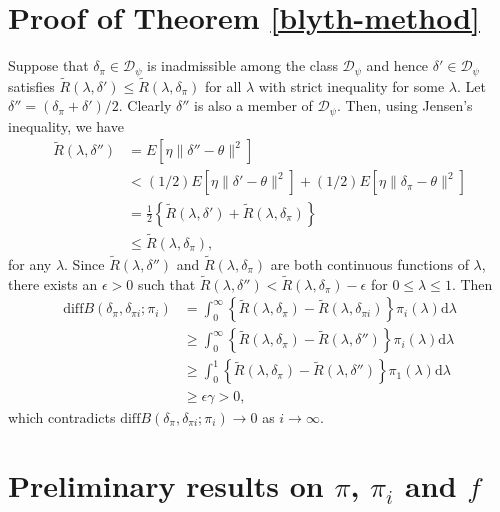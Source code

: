 \documentclass[preprint,11pt]{imsart}
\numberwithin{equation}{section}
\theoremstyle{plain}
\theoremstyle{definition}
\theoremstyle{remark}
\newcommand{\rd}{\mathrm{d}}
\newcommand{\ndiff}{\mathrm{diff}B}
\begin{document}
\section{Proof of Theorem \ref{blyth-method}}
\label{sec:ap.blyth-method}
 Suppose that $ \delta_\pi\in\mathcal{D}_\psi$ is inadmissible among the class $\mathcal{D}_\psi$
 and hence  $\delta'\in\mathcal{D}_\psi$ satisfies 
$ \tilde{R}(\lambda,\delta') \leq \tilde{R}(\lambda,\delta_\pi)$ for all $\lambda$
with strict inequality for some $\lambda$.
 Let $\delta''=(\delta_\pi+\delta')/2$. Clearly $\delta''$ is also a member of
 $\mathcal{D}_\psi$.
Then, using Jensen's inequality, we have
\begin{align*}
 \tilde{R}(\lambda,\delta'')
&=E\left[\eta\|\delta''-\theta\|^2\right] \\
&<(1/2)E\left[\eta\|\delta'-\theta\|^2\right] +(1/2)E\left[\eta\|\delta_\pi -\theta\|^2\right] \\
 &= \frac{1}{2}\left\{\tilde{R}(\lambda,\delta')+\tilde{R}(\lambda,\delta_\pi)\right\} \\
 &\leq  \tilde{R}(\lambda,\delta_\pi),
\end{align*}
for any $\lambda$. 
Since $  \tilde{R}(\lambda,\delta'')$ and $  \tilde{R}(\lambda,\delta_\pi)$ are both continuous
 functions of $\lambda$, there exists an $ \epsilon>0$ such that
$ \tilde{R}(\lambda,\delta'')< \tilde{R}(\lambda,\delta_\pi)-\epsilon$ for 
$ 0\leq \lambda\leq 1$. 
Then 
\begin{align*}
 \ndiff(\delta_\pi,\delta_{\pi i};\pi_i)
 &= \int_0^\infty \left\{\tilde{R}(\lambda,\delta_\pi)-\tilde{R}(\lambda,\delta_{\pi i})\right\}
 \pi_i(\lambda)\rd \lambda \\
 &\geq  \int_0^\infty
\left\{\tilde{R}(\lambda,\delta_\pi)-\tilde{R}(\lambda,\delta'')\right\}\pi_i(\lambda)\rd \lambda \\
 & \geq \int_0^1
\left\{\tilde{R}(\lambda,\delta_\pi)-\tilde{R}(\lambda,\delta'')\right\}\pi_1(\lambda)\rd \lambda \\
& \geq \epsilon \gamma>0,
\end{align*}
which contradicts $\ndiff(\delta_\pi,\delta_{\pi i};\pi_i) \to 0$ as $i\to\infty$.


\section{Preliminary results on $\pi$, $\pi_i$ and $f$}
\label{sec:assumption}
\end{document}
